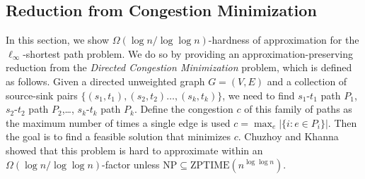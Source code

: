 \documentclass[11pt,a4paper]{article}
\begin{document}
\subsection{Reduction from Congestion Minimization}\label{sec:hardness-from-congestion-minimization}
In this section, we show $\Omega(\log n / \log \log n)$-hardness of approximation for the $\ell_\infty$-shortest path problem. We do so by providing an approximation-preserving reduction from the \emph{Directed Congestion Minimization} problem, which is defined as follows. Given a directed unweighted graph $G=(V,E)$ and a collection of source-sink pairs $\{(s_1,t_1),(s_2,t_2) \dots , (s_k,t_k)\}$, we need to find $s_1$-$t_1$ path $P_1$, $s_2$-$t_2$ path $P_2$,\dots, $s_k$-$t_k$ path $P_k$. Define the congestion $c$ of this family of paths as the maximum number of times a single edge is used $c= \max_e|\{i:e\in P_i\}|$. Then the goal is to find a feasible solution that minimizes $c$. Chuzhoy and Khanna~\cite{chuzhoy2006hardness} showed that this problem is hard to approximate within an $\Omega(\log n/\log\log n)$-factor unless $\mathrm{NP} \subseteq \mathrm{ZPTIME}(n^{\log \log n})$.

\end{document}
